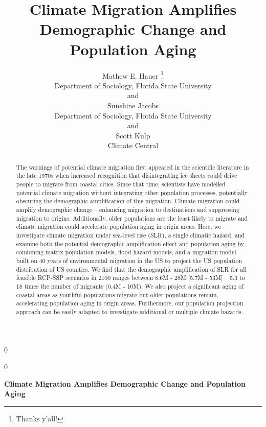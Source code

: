 \documentclass[12pt]{article}
\newcommand{\blind}{0}
\begin{document}
\def\spacingset#1{\renewcommand{\baselinestretch}%
{#1}\small\normalsize} \spacingset{1}



\blind
{
  \title{\bf Climate Migration Amplifies Demographic Change and
Population Aging}

  \author{
        Mathew E. Hauer \thanks{Thanks y'all!} \\
    Department of Sociology, Florida State University\\
     and \\     Sunshine Jacobs \\
    Department of Sociology, Florida State University\\
     and \\     Scott Kulp \\
    Climate Central\\
      }
  \maketitle
} \fi

\blind
{
  \bigskip
  \bigskip
  \bigskip
  \begin{center}
    {\LARGE\bf Climate Migration Amplifies Demographic Change and
Population Aging}
  \end{center}
  \medskip
} \fi

\bigskip
\begin{abstract}
The warnings of potential climate migration first appeared in the
scientific literature in the late 1970s when increased recognition that
disintegrating ice sheets could drive people to migrate from coastal
cities. Since that time, scientists have modelled potential climate
migration without integrating other population processes, potentially
obscuring the demographic amplification of this migration. Climate
migration could amplify demographic change -- enhancing migration to
destinations and suppressing migration to origins. Additionally, older
populations are the least likely to migrate and climate migration could
accelerate population aging in origin areas. Here, we investigate
climate migration under sea-level rise (SLR), a single climatic hazard,
and examine both the potential demographic amplification effect and
population aging by combining matrix population models, flood hazard
models, and a migration model built on 40 years of environmental
migration in the US to project the US population distribution of US
counties. We find that the demographic amplification of SLR for all
feasible RCP-SSP scenarios in 2100 ranges between 8.6M - 28M {[}5.7M -
53M{]} -- 5.3 to 18 times the number of migrants (0.4M - 10M). We also
project a significant aging of coastal areas as youthful populations
migrate but older populations remain, accelerating population aging in
origin areas. Furthermore, our population projection approach can be
easily adapted to investigate additional or multiple climate hazards.
\end{abstract}
\end{document}
